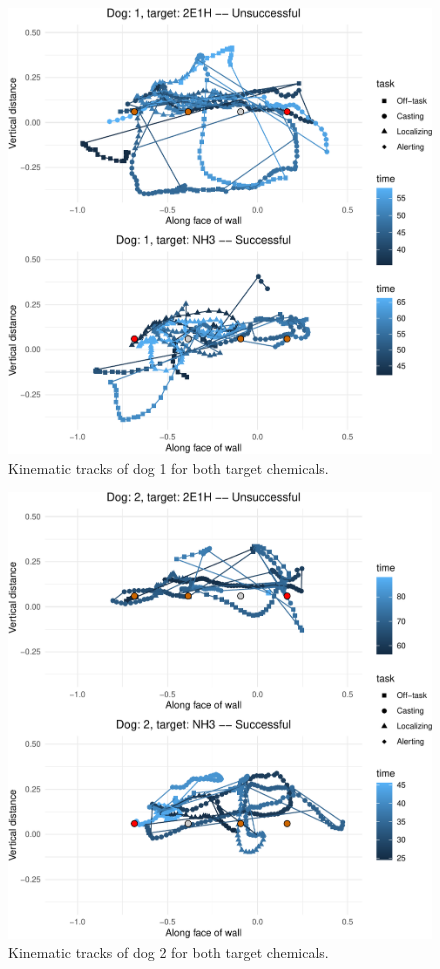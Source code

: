 \documentclass[
]{article}
\begin{document}
\begin{figure}
\centering
\includegraphics{supplementary-info_files/figure-latex/dog-1-1.pdf}
\caption{\label{fig:dog-1}Kinematic tracks of dog 1 for both target chemicals.}
\end{figure}

\begin{figure}
\centering
\includegraphics{supplementary-info_files/figure-latex/dog-2-1.pdf}
\caption{\label{fig:dog-2}Kinematic tracks of dog 2 for both target chemicals.}
\end{figure}
\end{document}
